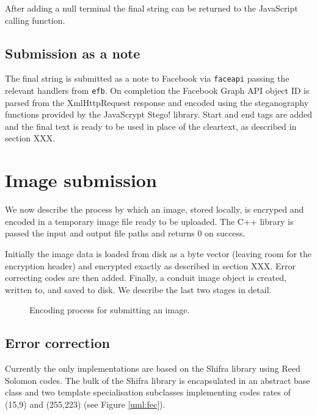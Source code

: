 After adding a null terminal the final string can be returned to the JavaScript calling function.


\FloatBarrier
\subsection{Submission as a note}

The final string is submitted as a note to Facebook via {\tt faceapi} passing the relevant handlers from {\tt efb}. On completion the Facebook Graph API object ID is parsed from the XmlHttpRequest response and encoded using the steganography functions provided by the JavaScrypt Stego! library. Start and end tags are added and the final text is ready to be used in place of the cleartext, as described in section XXX.



\FloatBarrier
\section{Image submission}

We now describe the process by which an image, stored locally, is encryped and encoded in a temporary image file ready to be uploaded. The C++ library is passed the input and output file paths and returns 0 on success.

Initially the image data is loaded from disk as a byte vector (leaving room for the encryption header) and encrypted exactly as described in section XXX. Error correcting codes are then added. Finally, a conduit image object is created, written to, and saved to disk. We describe the last two stages in detail.

    \begin{figure}[tb]
        \begin{center}
                
            \caption{Encoding process for submitting an image.}
            \label{tikz:text}
        \end{center}
    \end{figure}


\FloatBarrier
\subsection{Error correction}

Currently the only implementations are based on the Shifra library using Reed Solomon codes. The bulk of the Shifra library is encapsulated in an abstract base class and two template specialisation subclasses implementing codes rates of (15,9) and (255,223) (see Figure \ref{uml:fec}).


